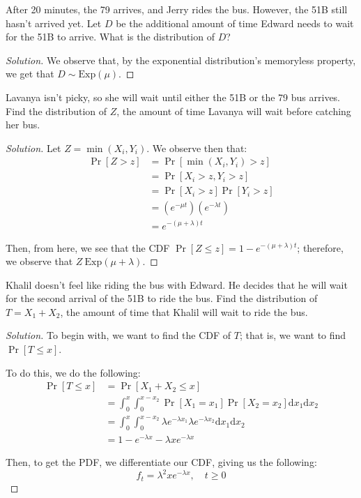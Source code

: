 \documentclass{article}
\newenvironment{solution}{\begin{proof}[Solution]}{\end{proof}}
\begin{document}
\begin{hw}
	After 20 minutes, the 79 arrives, and Jerry rides the bus. However, the 51B still hasn't arrived yet. Let $D$ be the additional amount of time Edward needs to wait  for the 51B to arrive. What is the distribution of $D$?
\end{hw}
\begin{solution}
	We observe that, by the exponential distribution's memoryless property, we get that $D \sim \mathrm{Exp}(\mu)$.
\end{solution}

\begin{hw}
	Lavanya isn't picky, so she will wait until either the 51B or the 79 bus arrives. Find the distribution of $Z$, the amount of time Lavanya will wait before catching her bus.
\end{hw}
\begin{solution}
	Let $Z = \min(X_{i}, Y_{i})$. We observe then that:
	\begin{align*}
		\Pr[Z > z] &= \Pr[\min(X_{i}, Y_{i}) > z] \\
		&= \Pr[X_{i} > z, Y_{i} > z] \\
		&= \Pr[X_{i} > z]\Pr[Y_{i} > z] \\
		&= \left( e^{-\mu t} \right)\left( e^{-\lambda t} \right) \\
		&= e^{-\left( \mu + \lambda \right) t}
	\end{align*}

	Then, from here, we see that the CDF $\Pr[Z \leq z] = 1 - e^{-\left( \mu + \lambda \right)t}$; therefore, we observe that $Z ~ \mathrm{Exp}\left( \mu + \lambda \right)$.
\end{solution}

\begin{hw}
	Khalil doesn't feel like riding the bus with Edward. He decides that he will wait for the second arrival of the 51B to ride the bus. Find the distribution of $T = X_1 + X_2$, the amount of time that Khalil will wait to ride the bus.
\end{hw}
\begin{solution}
	To begin with, we want to find the CDF of $T$; that is, we want to find $\Pr[T \leq x]$.
	
	To do this, we do the following:
	\begin{align*}
		\Pr[T \leq x] &= \Pr[X_{1} + X_{2} \leq x] \\
		&= \int_{0}^{x} \int_{0}^{x-x_{2}} \Pr[X_{1} = x_{1}]\Pr[X_{2} = x_{2}] \mathrm{d}x_1\mathrm{d}x_2 \\
		&= \int_{0}^{x} \int_{0}^{x-x_{2}} \lambda e^{-\lambda x_{1}} \lambda e^{-\lambda x_{2}} \mathrm{d}x_1\mathrm{d}x_2 \\
		&= 1 - e^{-\lambda x} - \lambda x e^{-\lambda x}
	\end{align*}

	Then, to get the PDF, we differentiate our CDF, giving us the following:
	\begin{equation*}
		f_{t} = \lambda^{2} x e^{-\lambda x}, \quad t \geq 0
	\end{equation*}
\end{solution}
\end{document}
